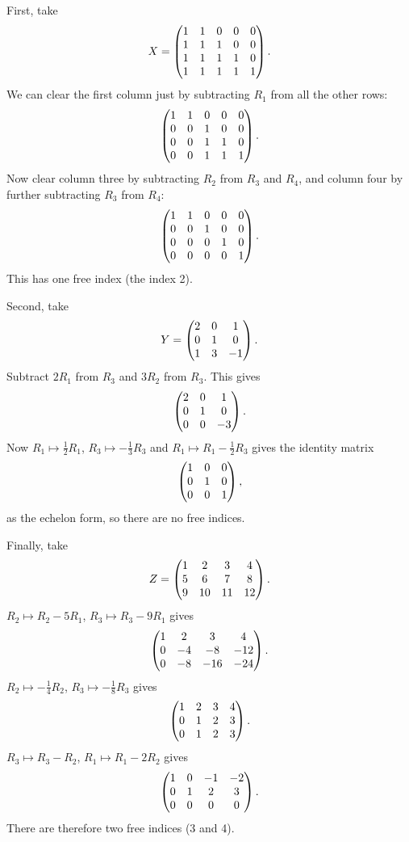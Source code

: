 \documentclass{article}
\begin{document}
\begin{Solution}
First, take \[X=\begin{pmatrix} 1 & 1 & 0 & 0 & 0 \\ 1 & 1 & 1 & 0 & 0 \\ 1 & 1
& 1 & 1 & 0 \\ 1 & 1 & 1 & 1 & 1 \end{pmatrix}.\] We can clear the first
column just by subtracting \(R_1\) from all the other rows: \[\begin{pmatrix} 1
& 1 & 0 & 0 & 0 \\ 0 & 0 & 1 & 0 & 0 \\ 0 & 0 & 1 & 1 & 0 \\ 0 & 0 &
1 & 1 & 1 \end{pmatrix}.\] Now clear column three by subtracting \(R_2\) from
\(R_3\) and \(R_4\), and column four by further subtracting \(R_3\)
from \(R_4\): \[\begin{pmatrix} 1 & 1 & 0 & 0 & 0 \\ 0 & 0 & 1 & 0 & 0 \\ 0 & 0
& 0 & 1 & 0 \\ 0 & 0 & 0 & 0 & 1 \end{pmatrix}.\] This has one free index (the
index 2).


Second, take \[Y=\begin{pmatrix} 2 & 0 & 1 \\ 0 & 1 & 0 \\ 1 & 3
& -1\end{pmatrix}.\] Subtract \(2R_1\) from \(R_3\) and \(3R_2\) from
\(R_3\). This gives
\[\begin{pmatrix} 2 & 0 & 1 \\ 0 & 1 & 0 \\ 0 & 0 & -3\end{pmatrix}.\]
Now \(R_1\mapsto\frac{1}{2}R_1\), \(R_3\mapsto-\frac{1}{3}R_3\) and
\(R_1\mapsto R_1-\frac{1}{2}R_3\) gives the identity matrix
\[\begin{pmatrix} 1 & 0 & 0 \\ 0 & 1 & 0 \\ 0 & 0 & 1\end{pmatrix},\]
as the echelon form, so there are no free indices.


Finally, take \[Z=\begin{pmatrix} 1 & 2 & 3 & 4 \\ 5 & 6 & 7 & 8 \\ 9 & 10 & 11
& 12\end{pmatrix}.\] \(R_2\mapsto R_2-5R_1\), \(R_3\mapsto R_3-9R_1\) gives
\[\begin{pmatrix} 1 & 2 & 3 & 4 \\ 0 & -4 & -8 & -12 \\ 0 & -8 & -16 & -24\end{pmatrix}.\]
\(R_2\mapsto-\frac{1}{4}R_2\), \(R_3\mapsto-\frac{1}{8}R_3\) gives
\[\begin{pmatrix} 1 & 2 & 3 & 4 \\ 0 & 1 & 2 & 3 \\ 0 & 1 & 2 & 3\end{pmatrix}.\]
\(R_3\mapsto R_3-R_2\), \(R_1\mapsto R_1-2R_2\) gives
\[\begin{pmatrix} 1 & 0 & -1 & -2 \\ 0 & 1 & 2 & 3 \\ 0 & 0 & 0 & 0\end{pmatrix}.\] There
are therefore two free indices (3 and 4).


\end{Solution}
\end{document}
